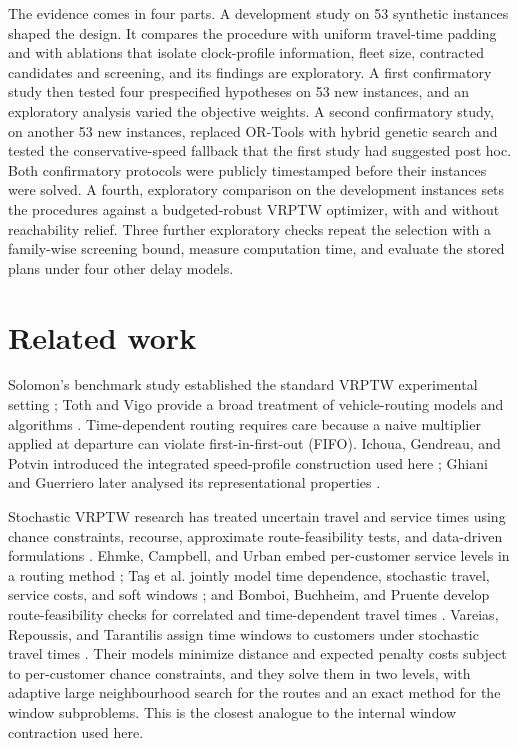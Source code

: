 \documentclass[11pt,a4paper]{article}
\begin{document}
The evidence comes in four parts. A development study on 53 synthetic instances
shaped the design. It compares the procedure with uniform travel-time padding and
with ablations that isolate clock-profile information, fleet size, contracted
candidates and screening, and its findings are exploratory. A first confirmatory
study then tested four prespecified hypotheses on 53 new instances, and an
exploratory analysis varied the objective weights. A second confirmatory study,
on another 53 new instances, replaced OR-Tools with hybrid genetic search
\cite{vidal2022,wouda2024} and tested the conservative-speed fallback that the
first study had suggested post hoc. Both confirmatory protocols were publicly
timestamped before their instances were solved. A fourth, exploratory comparison
on the development instances sets the procedures against a budgeted-robust VRPTW
optimizer, with and without reachability relief. Three further exploratory checks
repeat the selection with a family-wise screening bound, measure computation
time, and evaluate the stored plans under four other delay models.

\section{Related work}

Solomon's benchmark study established the standard VRPTW experimental setting
\cite{solomon1987}; Toth and Vigo provide a broad treatment of vehicle-routing
models and algorithms \cite{toth2014}. Time-dependent routing requires care
because a naive multiplier applied at departure can violate first-in-first-out
(FIFO). Ichoua, Gendreau, and Potvin introduced the integrated speed-profile
construction used here \cite{ichoua2003}; Ghiani and Guerriero later analysed
its representational properties \cite{ghiani2014}.

Stochastic VRPTW research has treated uncertain travel and service times using
chance constraints, recourse, approximate route-feasibility tests, and
data-driven formulations \cite{li2010,errico2018,bomboi2022,serrano2026}.
Ehmke, Campbell, and Urban embed per-customer service levels in a routing
method \cite{ehmke2015}; Ta\c{s} et al. jointly model time dependence,
stochastic travel, service costs, and soft windows \cite{tas2014}; and Bomboi,
Buchheim, and Pruente develop route-feasibility checks for correlated and
time-dependent travel times \cite{bomboi2022}. Vareias, Repoussis, and
Tarantilis assign time windows to customers under stochastic travel times
\cite{vareias2019}. Their models minimize distance and expected penalty costs
subject to per-customer chance constraints, and they solve them in two levels,
with adaptive large neighbourhood search for the routes and an exact method for
the window subproblems. This is the closest analogue to the internal window
contraction used here.
\end{document}
